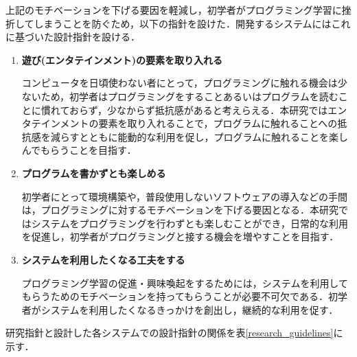 上記のモチベーションを下げる要因を軽減し，初学者がプログラミング学習に挫折してしまうことを防ぐため，以下の指針を設けた．開発するシステムにはこれに基づいた設計指針を設ける．

\begin{enumerate}
  \item {\bf 遊び(エンタテインメント)の要素を取り入れる}

  コンピュータを日頃使わない者にとって，プログラミングに触れる機会は少ないため，初学者はプログラミングをすることあるいはプログラムを読むことに慣れておらず，少なからず抵抗感があると考えらえる．本研究ではエンタテインメントの要素を取り入れることで，プログラムに触れることへの抵抗感を減らすとともに能動的な利用を促し，プログラムに触れることを楽しんでもらうことを目指す．

  \item {\bf プログラムを書かずとも楽しめる}

  初学者にとって環境構築や，普段使用しないソフトウェアの導入などの手間は，プログラミングに対するモチベーションを下げる要因となる．本研究ではシステムをプログラミングを行わずとも楽しむことができ，日常的な利用を促進し，初学者がプログラミングと接する機会を増やすことを目指す．

  \item {\bf システムを利用したくなる工夫をする}

  プログラミング学習の促進・興味喚起をするためには，システムを利用してもらうためのモチベーションを持ってもらうことが必要不可欠である．初学者がシステムを利用したくなるきっかけを創出し，継続的な利用を促す．

\end{enumerate}

研究指針と設計した各システムでの設計指針の関係を表\ref{research_guidelines}に示す．

